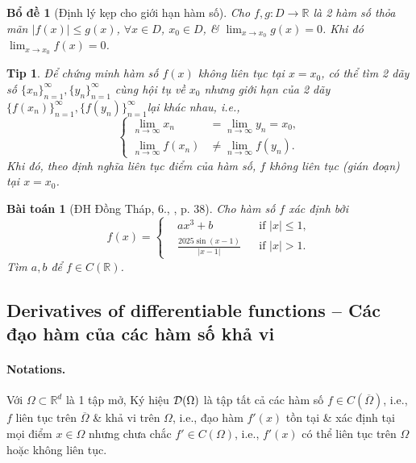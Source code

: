 \documentclass{article}
\newtheorem{baitoan}{Bài toán}
\newtheorem{bode}{Bổ đề}
\newtheorem{tip}{Tip}
\begin{document}
\begin{bode}[Định lý kẹp cho giới hạn hàm số]
	Cho $f,g:D\to\mathbb{R}$ là 2 hàm số thỏa mãn $|f(x)|\le g(x)$, $\forall x\in D$, $x_0\in D$, \& $\lim_{x\to x_0} g(x) = 0$. Khi đó $\lim_{x\to x_0} f(x) = 0$.
\end{bode}

\begin{tip}
	Để chứng minh hàm số $f(x)$ không liên tục tại $x = x_0$, có thể tìm 2 dãy số $\{x_n\}_{n=1}^\infty,\{y_n\}_{n=1}^\infty$ cùng hội tụ về $x_0$ nhưng giới hạn của 2 dãy $\{f(x_n)\}_{n=1}^\infty,\{f(y_n)\}_{n=1}^\infty$lại khác nhau, i.e.,
	\begin{equation*}
		\left\{\begin{split}
			\lim_{n\to\infty} x_n &= \lim_{n\to\infty} y_n = x_0,\\
			\lim_{n\to\infty} f(x_n)&\ne\lim_{n\to\infty} f(y_n).
		\end{split}\right.		
	\end{equation*}
	Khi đó, theo định nghĩa liên tục điểm của hàm số, $f$ không liên tục (gián đoạn) tại $x = x_0$.
\end{tip}

\begin{baitoan}[ĐH Đồng Tháp, 6., \cite{VMS_VMC2025}, p. 38]
	Cho hàm số $f$ xác định bởi
	\begin{equation*}
		f(x) = \left\{\begin{split}
			&ax^3 + b&&\mbox{if }|x|\le 1,\\
			&\frac{2025\sin(x - 1)}{|x - 1|}&&\mbox{if }|x| > 1.
		\end{split}\right.
	\end{equation*}
	Tìm $a,b$ để $f\in C(\mathbb{R})$.
\end{baitoan}


\subsection{Derivatives of differentiable functions -- Các đạo hàm của các hàm số khả vi}

\paragraph{Notations.} Với $\Omega\subset\mathbb{R}^d$ là 1 tập mở, Ký hiệu ${\cal D}(\Omega)$ là tập tất cả các hàm số $f\in C(\overline{\Omega})$, i.e., $f$ liên tục trên $\overline{\Omega}$ \& khả vi trên $\Omega$, i.e., đạo hàm $f'(x)$ tồn tại \& xác định tại mọi điểm $x\in\Omega$ nhưng chưa chắc $f'\in C(\Omega)$, i.e., $f'(x)$ có thể liên tục trên $\Omega$ hoặc không liên tục.
\end{document}
